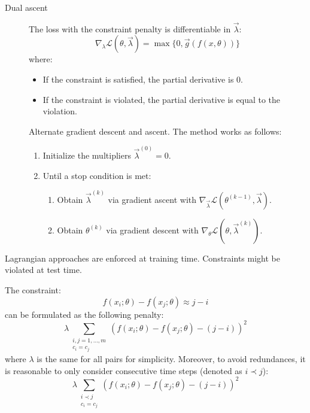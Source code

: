 \begin{description}
\begin{description}
\begin{description}
                \item[Dual ascent] 
                    \begin{remark}
                        The loss with the constraint penalty is differentiable in $\vec{\lambda}$:
                        \[ \nabla_\lambda \mathcal{L}(\theta, \vec{\lambda}) = \max \{ 0, \vec{g}(f(x, \theta)) \} \]
                        where:
                        \begin{itemize}
                            \item If the constraint is satisfied, the partial derivative is $0$.
                            \item If the constraint is violated, the partial derivative is equal to the violation.
                        \end{itemize}
                    \end{remark}

                    Alternate gradient descent and ascent. The method works as follows:
                    \begin{enumerate}
                        \item Initialize the multipliers $\vec{\lambda}^{(0)} = 0$.
                        \item Until a stop condition is met:
                        \begin{enumerate}
                            \item Obtain $\vec{\lambda}^{(k)}$ via gradient ascent with $\nabla_\vec{\lambda} \mathcal{L}(\theta^{(k-1)}, \vec{\lambda})$.
                            \item Obtain $\theta^{(k)}$ via gradient descent with $\nabla_\theta \mathcal{L}(\theta, \vec{\lambda}^{(k)})$.
                        \end{enumerate}
                    \end{enumerate}
                \end{description}
        \end{description}

        \begin{remark}
            Lagrangian approaches are enforced at training time. Constraints might be violated at test time.
        \end{remark}

        \begin{example}
            The constraint:
            \[ f(x_i; \theta) - f(x_j; \theta) \approx j - i \]
            can be formulated as the following penalty:
            \[ \lambda \sum_{\substack{i,j=1, \dots, m\\c_i = c_j}} (f(x_i; \theta) - f(x_j; \theta) - (j-i))^2 \]
            where $\lambda$ is the same for all pairs for simplicity.
            Moreover, to avoid redundances, it is reasonable to only consider consecutive time steps (denoted as $i \prec j$):
            \[ \lambda \sum_{\substack{i \prec j\\c_i = c_j}} (f(x_i; \theta) - f(x_j; \theta) - (j-i))^2 \]


\end{example}
\end{description}
